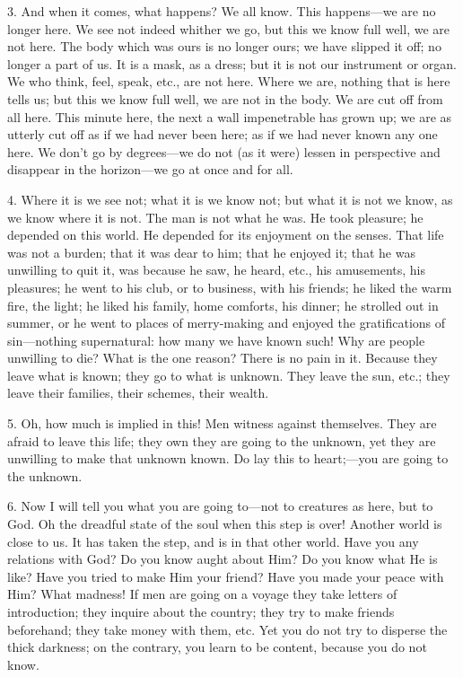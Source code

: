 3. And when it comes, what happens? We all know.
This happens—we are no longer here. We see not indeed whither we go,
but this we know full well, we are not here. The body which was ours
is no longer ours; we have slipped it off; no longer a part of
us. It is a mask, as a dress; but it is not our instrument or organ.
We who think, feel, speak, etc., are not here. Where we are, nothing
that is here tells us; but this we know full well, we are not in the
body. We are cut off from all here. This minute here, the next a wall
impenetrable has grown up; we are as utterly cut off as if we had
never been here; as if we had never known any one here. We don't go by
degrees—we do not (as it were) lessen in perspective and disappear
in the horizon—we go at once and for all.

4. Where it is we see not; what it is we know
not; but what it is not we know, as we know where it is not. The man
is not what he was. He took pleasure; he depended on this world. He
depended for its enjoyment on the senses. That life was not a burden;
that it was dear to him; that he enjoyed it; that he was unwilling to
quit it, was because he saw, he heard, etc., his amusements, his
pleasures; he went to his club, or to business, with his friends; he
liked the warm fire, the light; he liked his family, home comforts,
his dinner; he strolled out in summer, or he went to places of
merry-making and enjoyed the gratifications of sin—nothing
supernatural: how many we have known such! Why are people unwilling to
die? What is the one reason? There is no pain in it. Because they
leave what is known; they go to what is unknown. They leave the sun,
etc.; they leave their families, their schemes, their wealth.

5. Oh, how much is implied in this! Men witness
against themselves. They are afraid to leave this life; they own
they are going to the unknown, yet they are unwilling to make that
unknown known. Do lay this to heart;—you are going to the unknown.

6. Now I will tell you what you are going
to—not to creatures as here, but to God. Oh the dreadful state of
the soul when this step is over! Another world is close to us. It has
taken the step, and is in that other world. Have you any relations
with God? Do you know aught about Him? Do you know what He is like?
Have you tried to make Him your friend? Have you made your peace with
Him? What madness! If men are going on a voyage they take letters of
introduction; they inquire about the country; they try to make friends
beforehand; they take money with them, etc. Yet you do not try to
disperse the thick darkness; on the contrary, you learn to be content,
because you do not know.

